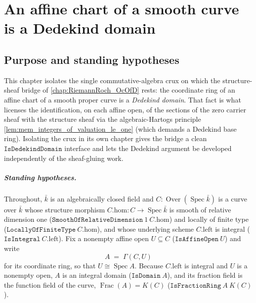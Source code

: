 
\chapter{An affine chart of a smooth curve is a Dedekind domain}
\label{chap:RiemannRoch_CurveChartDedekind}

\providecommand{\Spec}{\operatorname{Spec}}
\providecommand{\krullDim}{\dim}
\providecommand{\coheight}{\operatorname{coheight}}
\providecommand{\Frac}{\operatorname{Frac}}
\providecommand{\Over}{\operatorname{Over}}


\section{Purpose and standing hypotheses}

This chapter isolates the single commutative-algebra crux on which the
structure-sheaf bridge of \cref{chap:RiemannRoch_OcOfD} rests: the coordinate
ring of an affine chart of a smooth proper curve is a \emph{Dedekind domain}.
That fact is what licenses the identification, on each affine open, of the
sections of the zero carrier sheaf with the structure sheaf via the
algebraic-Hartogs principle \cref{lem:mem_integers_of_valuation_le_one} (which
demands a Dedekind base ring). Isolating the crux in its own chapter gives the
bridge a clean \(\texttt{IsDedekindDomain}\) interface and lets
the Dedekind argument be developed independently of the sheaf-gluing work.

\paragraph{Standing hypotheses.} Throughout, \(\bar k\) is an algebraically
closed field and \(C : \Over(\Spec \bar k)\) is a curve over \(\bar k\) whose
structure morphism \(C.\mathrm{hom} : C \to \Spec \bar k\) is smooth of
relative dimension one (\(\texttt{SmoothOfRelativeDimension}\ 1\ C.\mathrm{hom}\))
and locally of finite type (\(\texttt{LocallyOfFiniteType}\ C.\mathrm{hom}\)),
and whose underlying scheme \(C.\mathrm{left}\) is integral
(\(\texttt{IsIntegral}\ C.\mathrm{left}\)). Fix a nonempty affine open
\(U \subseteq C\) (\(\texttt{IsAffineOpen}\ U\)) and write
\[
  A \;=\; \Gamma(C, U)
\]
for its coordinate ring, so that \(U \cong \Spec A\). Because \(C.\mathrm{left}\)
is integral and \(U\) is a nonempty open, \(A\) is an integral domain
(\(\texttt{IsDomain}\ A\)), and its fraction field is the function field of the
curve, \(\Frac(A) = K(C)\) (\(\texttt{IsFractionRing}\ A\ K(C)\)).

